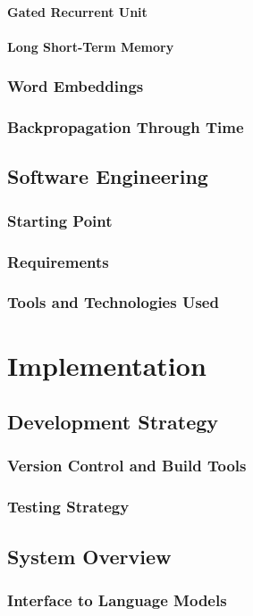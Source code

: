 \documentclass[a4paper, 12pt]{report}
\begin{document}
\subsubsection{Gated Recurrent Unit}
\subsubsection{Long Short-Term Memory}
\subsection{Word Embeddings}
\subsection{Backpropagation Through Time}
\section{Software Engineering}
\subsection{Starting Point}
\subsection{Requirements}
\subsection{Tools and Technologies Used}

\chapter{Implementation}
\section{Development Strategy}
\subsection{Version Control and Build Tools}
\subsection{Testing Strategy}
\section{System Overview}
\subsection{Interface to Language Models}
\end{document}

